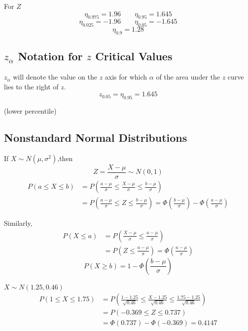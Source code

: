 \begin{exmp}
For $Z$
\[\eta_{0.975}=1.96 \qquad \eta_{0.95}=1.645\]
\[\eta_{0.025}=-1.96 \qquad \eta_{0.05}=-1.645\]
\[\eta_{0.9}=1.28\]
\end{exmp}


\subsection{$z_{\alpha}$ Notation for $z$ Critical Values}
$z_{\alpha}$ will denote the value on the $z$ axis for which $\alpha$ of the area under the $z$ curve lies to the right of $z$. 
\[z_{0.05}=\eta_{0.95}=1.645\]

(lower percentile)
\subsection{Nonstandard Normal Distributions}
If $X \sim N(\mu,\sigma^2) $,then
\[Z=\frac{X-\mu}{\sigma} \sim N(0,1)\]
\begin{align*}
P(a\leq X\leq b) &= P \left(\frac{a-\mu}{\sigma} \leq \frac{X-\mu}{\sigma} \leq \frac{b-\mu}{\sigma} \right)  \\
& = P \left( \frac{a-\mu}{\sigma} \leq Z \leq \frac{b-\mu}{\sigma} \right) =\Phi \left(\frac{b-\mu}{\sigma} \right)- \Phi \left(\frac{a-\mu}{\sigma} \right)
\end{align*}

Similarly,
\begin{align*}
P(X\leq a) &= P \left(\frac{X-\mu}{\sigma} \leq \frac{a-\mu}{\sigma} \right)  \\
& = P \left(  Z \leq \frac{a-\mu}{\sigma} \right) =\Phi \left(\frac{a-\mu}{\sigma} \right)
\end{align*}
\[P(X \geq b)=1-\Phi \left(\frac{b-\mu}{\sigma} \right)\]

\begin{exmp}
$X \sim N(1.25,0.46)$
\begin{align*}
P(1 \leq X\leq 1.75) &= P \left(\frac{1-1.25}{\sqrt{0.46}} \leq \frac{X-1.25}{\sqrt{0.46}} \leq \frac{1.75-1.25}{\sqrt{0.46}} \right)  \\
& = P \left( -0.369 \leq Z \leq 0.737 \right)\\
&=\Phi \left(0.737 \right)- \Phi \left(-0.369 \right)=\boxed{0.4147}
\end{align*}
\end{exmp}

